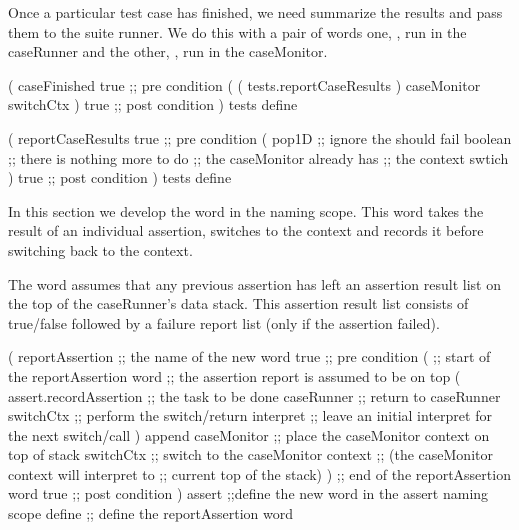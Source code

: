 
Once a particular test case has finished, we need summarize the results 
and pass them to the suite runner. We do this with a pair of words one, 
, run in the caseRunner and the other, 
, run in the caseMonitor. 

\startJoylolCode
(
  caseFinished
  { true } ;; pre condition
  (
    ( tests.reportCaseResults )
    caseMonitor
    switchCtx
  )
  { true } ;; post condition
)
tests
define
\stopJoylolCode

\startJoylolCode
( 
  reportCaseResults
  { true } ;; pre condition
  (
    pop1D   ;; ignore the should fail boolean
            ;; there is nothing more to do
            ;; the caseMonitor already has
            ;; the context swtich 
  )
  { true }  ;; post condition
)
tests
define
\stopJoylolCode

\stopTestSuite


In this section we develop the  word in the 
 naming scope. This word takes the result of an individual 
assertion, switches to the  context and records it 
before switching back to the  context. 

The  word assumes that any previous assertion has 
left an assertion result list on the top of the caseRunner's data stack. 
This assertion result list consists of true/false followed by a failure 
report list (only if the assertion failed). 

\startJoylolCode
(
  reportAssertion ;; the name of the new word
  { true }        ;; pre condition
  (               ;; start of the reportAssertion word
                  ;; the assertion report is assumed to be on top
    (
      assert.recordAssertion  ;; the task to be done
      caseRunner  ;; return to caseRunner
      switchCtx   ;; perform the switch/return
      interpret   ;; leave an initial interpret for the next switch/call
    )
    append
    caseMonitor   ;; place the caseMonitor context on top of stack
    switchCtx     ;; switch to the caseMonitor context
                  ;; (the caseMonitor context will interpret to
                  ;;  current top of the stack)
  )               ;; end of the reportAssertion word
  { true }        ;; post condition
)
assert          ;;define the new word in the assert naming scope
define          ;; define the reportAssertion word
\stopJoylolCode
\stopTestSuite

